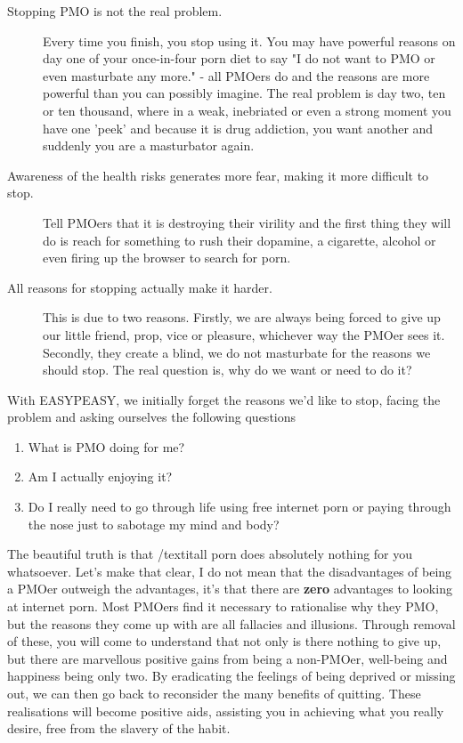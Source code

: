 \documentclass[easypeasy.tex]{subfiles}
\begin{document}
\begin{description}
\item [Stopping PMO is not the real problem.] Every time you finish, you stop using it. You may have powerful reasons on day one of your once-in-four porn diet to say "I do not want to PMO or even masturbate any more." - all PMOers do and the reasons are more powerful than you can possibly imagine. The real problem is day two, ten or ten thousand, where in a weak, inebriated or even a strong moment you have one 'peek' and because it is drug addiction, you want another and suddenly you are a masturbator again.

\item [Awareness of the health risks generates more fear, making it more difficult to stop.]Tell PMOers that it is destroying their virility and the first thing they will do is reach for something to rush their dopamine, a cigarette, alcohol or even firing up the browser to search for porn.

\item [All reasons for stopping actually make it harder.] This is due to two reasons. Firstly, we are always being forced to give up our little friend, prop, vice or pleasure, whichever way the PMOer sees it. Secondly, they create a blind, we do not masturbate for the reasons we should stop. The real question is, why do we want or need to do it?
\end{description}
With EASYPEASY, we initially forget the reasons we'd like to stop, facing the problem and asking ourselves the following questions
\begin{enumerate}
\item What is PMO doing for me?
\item Am I actually enjoying it?
\item Do I really need to go through life using free internet porn or paying through the nose just to sabotage my mind and body?
\end{enumerate}
The beautiful truth is that /textit{all porn} does absolutely nothing for you whatsoever. Let's make that clear, I do not mean that the disadvantages of being a PMOer outweigh the advantages, it's that there are \textbf{zero} advantages to looking at internet porn. Most PMOers find it necessary to rationalise why they PMO, but the reasons they come up with are all fallacies and illusions. Through removal of these, you will come to understand that not only is there nothing to give up, but there are marvellous positive gains from being a non-PMOer, well-being and happiness being only two. By eradicating the feelings of being deprived or missing out, we can then go back to reconsider the many benefits of quitting. These realisations will become positive aids, assisting you in achieving what you really desire, free from the slavery of the habit.
\end{document}
